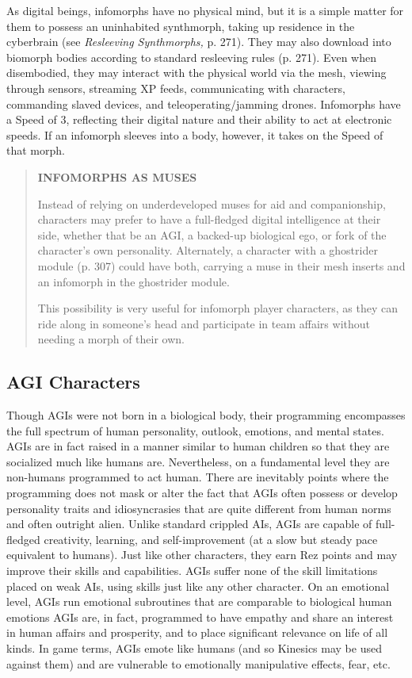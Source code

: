 As digital beings, infomorphs have no physical 
mind, but it is a simple matter for them to possess 
an uninhabited synthmorph, taking up residence in 
the cyberbrain (see \textit{Resleeving Synthmorphs,} p. 271). 
They may also download into biomorph bodies according
to standard resleeving rules (p. 271). Even
when disembodied, they may interact with the 
physical world via the mesh, viewing through sensors, 
streaming XP feeds, communicating with characters, 
commanding slaved devices, and teleoperating/jamming
drones.
Infomorphs have a Speed of 3, reflecting their digital
nature and their ability to act at electronic speeds.
If an infomorph sleeves into a body, however, it takes 
on the Speed of that morph.


\begin{quotation}
\textbf{INFOMORPHS AS MUSES}

Instead of relying on underdeveloped muses for
aid and companionship, characters may prefer to
have a full-fledged digital intelligence at their
side, whether that be an AGI, a backed-up biological
ego, or fork of the character’s own personality.
Alternately, a character with a ghostrider
module (p. 307) could have both, carrying a muse
in their mesh inserts and an infomorph in the
ghostrider module.

This possibility is very useful for infomorph
player characters, as they can ride along in someone’s
head and participate in team affairs without
needing a morph of their own.
\end{quotation}

\subsection{AGI Characters}

Though AGIs were not born in a biological body, their 
programming encompasses the full spectrum of human 
personality, outlook, emotions, and mental states. AGIs 
are in fact raised in a manner similar to human children
so that they are socialized much like humans are.
Nevertheless, on a fundamental level they are non-humans
programmed to act human. There are inevitably
points where the programming does not mask or alter 
the fact that AGIs often possess or develop personality 
traits and idiosyncrasies that are quite different from 
human norms and often outright alien.
Unlike standard crippled AIs, AGIs are capable of 
full-fledged creativity, learning, and self-improvement 
(at a slow but steady pace equivalent to humans). Just 
like other characters, they earn Rez points and may 
improve their skills and capabilities. AGIs suffer none 
of the skill limitations placed on weak AIs, using skills 
just like any other character.
On an emotional level, AGIs run emotional subroutines
that are comparable to biological human emotions
AGIs are, in fact, programmed to have empathy
and share an interest in human affairs and prosperity, 
and to place significant relevance on life of all kinds. 
In game terms, AGIs emote like humans (and so Kinesics
may be used against them) and are vulnerable to
emotionally manipulative effects, fear, etc.

